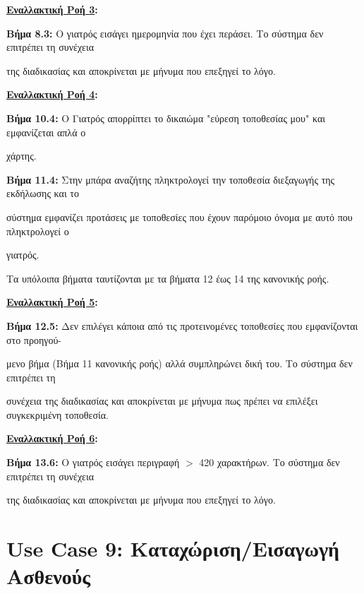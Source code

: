 \documentclass{article}
\begin{document}
\textbf{\underline{Εναλλακτική Ροή 3}:} \vspace{0.2cm}
\par \textbf{Βήμα 8.3:} Ο γιατρός εισάγει ημερομηνία που έχει περάσει. Το σύστημα δεν επιτρέπει τη συνέχεια \par της διαδικασίας και αποκρίνεται με μήνυμα που επεξηγεί το λόγο. \vspace{0.2cm}

\textbf{\underline{Εναλλακτική Ροή 4}:} \vspace{0.2cm}
\par \textbf{Βήμα 10.4:} Ο Γιατρός απορρίπτει το δικαιώμα "εύρεση τοποθεσίας μου" και εμφανίζεται απλά ο \par χάρτης. \vspace{0.1cm}
\par \textbf{Βήμα 11.4:} Στην μπάρα αναζήτης πληκτρολογεί την τοποθεσία διεξαγωγής της εκδήλωσης και το \par σύστημα εμφανίζει προτάσεις με τοποθεσίες που έχουν παρόμοιο όνομα με αυτό που πληκτρολογεί ο \par γιατρός. \vspace{0.1cm}

Τα υπόλοιπα βήματα ταυτίζονται με τα βήματα 12 έως 14 της κανονικής ροής. \vspace{0.2cm}

\textbf{\underline{Εναλλακτική Ροή 5}:} \vspace{0.2cm}
\par \textbf{Βήμα 12.5:} Δεν επιλέγει κάποια από τις προτεινομένες τοποθεσίες που εμφανίζονται στο προηγού- \par μενο βήμα (Βήμα 11 κανονικής ροής) αλλά συμπληρώνει δική του. Το σύστημα δεν επιτρέπει τη \par συνέχεια της διαδικασίας και αποκρίνεται με μήνυμα πως πρέπει να επιλέξει συγκεκριμένη τοποθεσία. \vspace{0.2cm}

\textbf{\underline{Εναλλακτική Ροή 6}:} \vspace{0.2cm}
\par \textbf{Βήμα 13.6:} Ο γιατρός εισάγει περιγραφή $>$ 420 χαρακτήρων. Το σύστημα δεν επιτρέπει τη συνέχεια \par της διαδικασίας και αποκρίνεται με μήνυμα που επεξηγεί το λόγο.

\section{Use Case 9: Καταχώριση/Εισαγωγή Ασθενούς}
\end{document}
